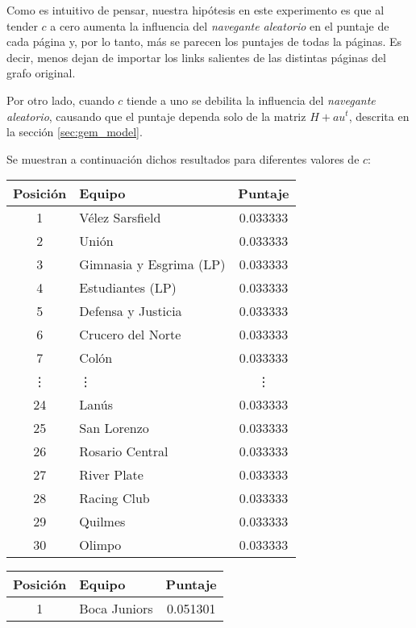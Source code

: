 Como es intuitivo de pensar, nuestra hipótesis en este experimento es que al tender
$c$ a cero aumenta la influencia del \textit{navegante aleatorio} en el puntaje de
cada página y, por lo tanto, más se parecen los puntajes de todas la páginas.
Es decir, menos dejan de importar los links salientes de las distintas páginas
del grafo original.

Por otro lado, cuando $c$ tiende a uno se debilita la influencia del \textit{navegante
aleatorio}, causando que el puntaje dependa solo de la matriz $H + au^{t}$, descrita
en la sección \ref{sec:gem_model}.

Se muestran a continuación dichos resultados para diferentes valores de $c$:

\begin{table}[H]
    \begin{center}
        \begin{tabular}{| c | l | c |}
            \hline
            Posición & Equipo & Puntaje \\ \hline
            1 & Vélez Sarsfield & 0.033333 \\
            2 & Unión & 0.033333 \\
            3 & Gimnasia y Esgrima (LP) & 0.033333 \\
            4 & Estudiantes (LP) & 0.033333 \\
            5 & Defensa y Justicia & 0.033333 \\
            6 & Crucero del Norte & 0.033333 \\
            7 & Colón & 0.033333 \\
            \vdots & \quad\vdots & \vdots \\
            24 & Lanús & 0.033333 \\
            25 & San Lorenzo & 0.033333 \\
            26 & Rosario Central & 0.033333 \\
            27 & River Plate & 0.033333 \\
            28 & Racing Club & 0.033333 \\
            29 & Quilmes & 0.033333 \\
            30 & Olimpo & 0.033333 \\
            \hline
        \end{tabular}
        \begin{tabular}{| c | l | c |}
            \hline
            Posición & Equipo & Puntaje \\ \hline
            1 & Boca Juniors & 0.051301 \\

\end{tabular}
\end{center}
\end{table}
